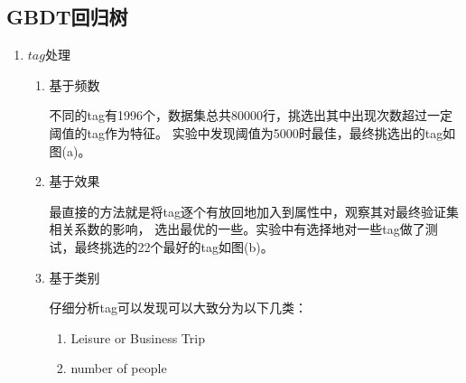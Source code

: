 \documentclass[UTF8,a4paper,12pt]{article}
\begin{document}
\subsection{GBDT回归树}
\begin{enumerate}[itemindent=0.5em,label=\arabic*、]
  \item $tag$处理
  \begin{enumerate}[itemindent=0.5em,label=(\arabic*)]
    \item 基于频数
    \par 不同的tag有1996个，数据集总共80000行，挑选出其中出现次数超过一定阈值的tag作为特征。
    实验中发现阈值为5000时最佳，最终挑选出的tag如图(a)。
    \begin{figure}[H]
    \centering
    \end{figure}
    \item 基于效果
    \par 最直接的方法就是将tag逐个有放回地加入到属性中，观察其对最终验证集相关系数的影响，
    选出最优的一些。实验中有选择地对一些tag做了测试，最终挑选的22个最好的tag如图(b)。
    \item 基于类别
    \par 仔细分析tag可以发现可以大致分为以下几类：
    \begin{enumerate}
      \item Leisure or Business Trip
      \item number of people

\end{enumerate}
\end{enumerate}
\end{enumerate}
\end{document}

